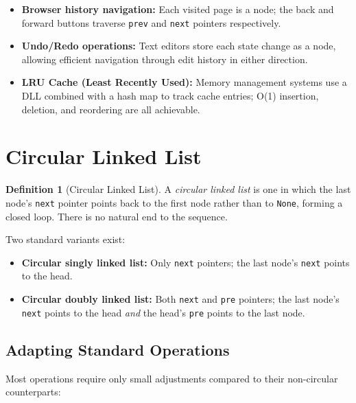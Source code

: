 \documentclass[11pt, a4paper, notitlepage]{report}
\theoremstyle{definition}
\newtheorem{definition}[theorem]{Definition}
\theoremstyle{remark}
\theoremstyle{definition}
\begin{document}
\begin{itemize}
  \item \textbf{Browser history navigation:} Each visited page is a node;
        the back and forward buttons traverse \texttt{prev} and \texttt{next}
        pointers respectively.
  \item \textbf{Undo/Redo operations:} Text editors store each state change
        as a node, allowing efficient navigation through edit history in either
        direction.
  \item \textbf{LRU Cache (Least Recently Used):} Memory management systems
        use a DLL combined with a hash map to track cache entries; O(1)
        insertion, deletion, and reordering are all achievable.
\end{itemize}

\section{Circular Linked List}
\label{sec:circular}

\begin{definition}[Circular Linked List]
\label{def:circular}
A \emph{circular linked list} is one in which the last node's \texttt{next}
pointer points back to the first node rather than to \texttt{None}, forming a
closed loop. There is no natural end to the sequence.
\end{definition}

Two standard variants exist:

\begin{itemize}
  \item \textbf{Circular singly linked list:} Only \texttt{next} pointers;
        the last node's \texttt{next} points to the head.
  \item \textbf{Circular doubly linked list:} Both \texttt{next} and
        \texttt{pre} pointers; the last node's \texttt{next} points to the
        head \emph{and} the head's \texttt{pre} points to the last node.
\end{itemize}

\subsection{Adapting Standard Operations}
\label{subsec:circular-ops}

Most operations require only small adjustments compared to their non-circular
counterparts:
\end{document}
